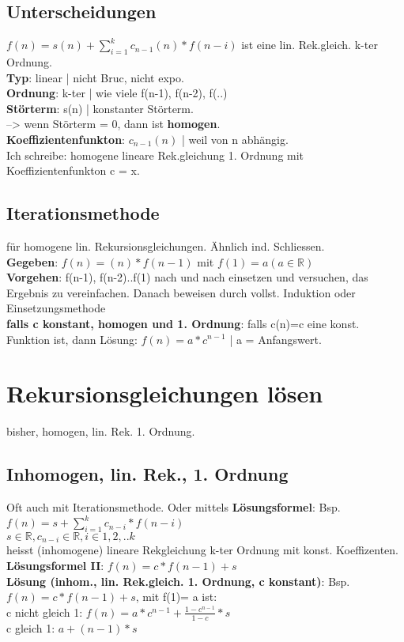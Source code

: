 \subsection{Unterscheidungen}
$f(n) = s(n) + \sum_{i=1}^k c_{n-1}(n) * f(n-i) $
ist eine lin. Rek.gleich. k-ter Ordnung.\\
\textbf{Typ}: linear | nicht Bruc, nicht expo.\\
\textbf{Ordnung}: k-ter | wie viele f(n-1), f(n-2), f(..)\\
\textbf{Störterm}: s(n) | konstanter Störterm.\\
--> wenn Störterm = 0, dann ist \textbf{homogen}.\\
\textbf{Koeffizientenfunkton}: $c_{n-1}(n)$ |  weil von n abhängig.\\
Ich schreibe: homogene lineare Rek.gleichung 1. Ordnung mit Koeffizientenfunkton c = x.\\

\subsection{Iterationsmethode}
für homogene lin. Rekursionsgleichungen. Ähnlich ind. Schliessen.\\
\textbf{Gegeben}: $f(n) = (n) * f(n-1)$ mit $f(1) = a (a \in  \mathbb{R})$\\
\textbf{Vorgehen}: f(n-1), f(n-2)..f(1) nach und nach einsetzen und versuchen, das Ergebnis zu vereinfachen. Danach beweisen durch vollst. Induktion oder Einsetzungsmethode\\
\textbf{falls c konstant, homogen und 1. Ordnung}: falls c(n)=c eine konst. Funktion ist, dann Lösung:
$f(n) = a * c^{n-1}$ | a = Anfangswert.\\

\section{Rekursionsgleichungen lösen}
bisher, homogen, lin. Rek. 1. Ordnung.\\
\subsection{Inhomogen, lin. Rek., 1. Ordnung}
Oft auch mit Iterationsmethode. Oder mittels \textbf{Lösungsformel}:
Bsp. $f(n) = s + \sum_{i=1}^k c_{n-i} * f(n-i) $\\
$s \in \mathbb{R} , c_{n-i} \in \mathbb{R}, i \in {1,2,..k} $\\ heisst (inhomogene) lineare Rekgleichung k-ter Ordnung mit konst. Koeffizenten.\\
\textbf{Lösungsformel II}: $f(n) = c * f(n-1) + s$ \\
\textbf{Lösung (inhom., lin. Rek.gleich. 1. Ordnung, c konstant)}: Bsp. $f(n) = c * f(n-1) + s$, mit f(1)= a ist: \\
c nicht gleich 1: $f(n) = a * c^{n-1} + \frac{1-c^{n-1}}{1-c} * s $\\
c gleich 1: $a + (n-1)* s$\\

